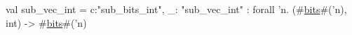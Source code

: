 val sub_vec_int = {c:"sub_bits_int", _: "sub_vec_int"} : forall 'n. (#\hyperref[zbits]{bits}#('n), int) -> #\hyperref[zbits]{bits}#('n)
